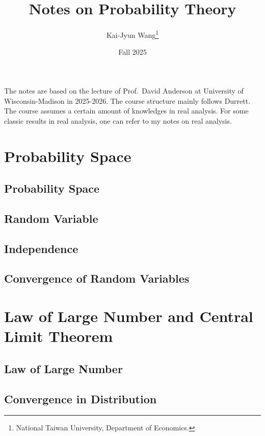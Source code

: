 \documentclass[a4paper, 12pt]{article}
\title{Notes on Probability Theory}
\author{Kai-Jyun Wang\thanks{National Taiwan University, Department of Economics.}}
\date{Fall 2025}
\begin{document}
 
\maketitle

The notes are based on the lecture of Prof.\ David Anderson at University of Wisconsin-Madison 
in 2025-2026. The course structure mainly follows Durrett. The course assumes 
a certain amount of knowledges in real analysis. For some classic results 
in real analysis, one can refer to my notes on real analysis.  

\newpage 
\tableofcontents
\newpage

\section{Probability Space}
\subsection{Probability Space}

\newpage

\subsection{Random Variable}

\newpage

\subsection{Independence}

\newpage

\subsection{Convergence of Random Variables}

\newpage

\section{Law of Large Number and Central Limit Theorem}

\subsection{Law of Large Number}

\newpage

\subsection{Convergence in Distribution}

\newpage
\end{document}
